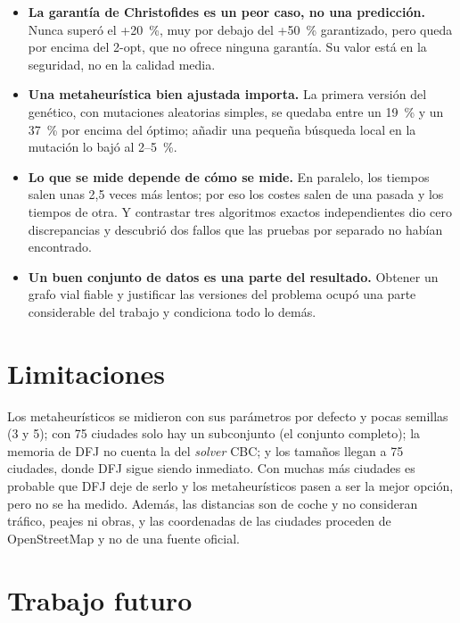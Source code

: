 \begin{itemize}
  \item \textbf{La garantía de Christofides es un peor caso, no una predicción.} Nunca superó el +20~\%, muy por debajo del +50~\% garantizado, pero queda por encima del 2-opt, que no ofrece ninguna garantía. Su valor está en la seguridad, no en la calidad media.
  \item \textbf{Una metaheurística bien ajustada importa.} La primera versión del genético, con mutaciones aleatorias simples, se quedaba entre un 19~\% y un 37~\% por encima del óptimo; añadir una pequeña búsqueda local en la mutación lo bajó al 2--5~\%.
  \item \textbf{Lo que se mide depende de cómo se mide.} En paralelo, los tiempos salen unas 2,5 veces más lentos; por eso los costes salen de una pasada y los tiempos de otra. Y contrastar tres algoritmos exactos independientes dio cero discrepancias y descubrió dos fallos que las pruebas por separado no habían encontrado.
  \item \textbf{Un buen conjunto de datos es una parte del resultado.} Obtener un grafo vial fiable y justificar las versiones del problema ocupó una parte considerable del trabajo y condiciona todo lo demás.
\end{itemize}

\section{Limitaciones}

Los metaheurísticos se midieron con sus parámetros por defecto y pocas semillas (3 y 5); con 75 ciudades solo hay un subconjunto (el conjunto completo); la memoria de DFJ no cuenta la del \emph{solver} CBC; y los tamaños llegan a 75 ciudades, donde DFJ sigue siendo inmediato.
Con muchas más ciudades es probable que DFJ deje de serlo y los metaheurísticos pasen a ser la mejor opción, pero no se ha medido. Además, las distancias son de coche y no consideran tráfico, peajes ni obras, y las coordenadas de las ciudades proceden de OpenStreetMap y no de una fuente oficial.

\section{Trabajo futuro}

